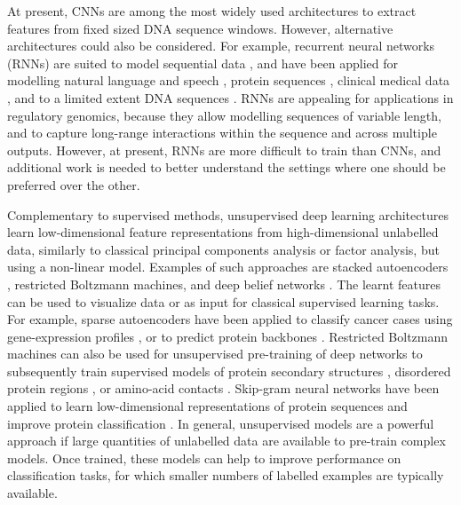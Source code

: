 At present, CNNs are among the most widely used architectures to extract features from fixed sized DNA sequence windows. However, alternative architectures could also be considered. For example, recurrent neural networks (RNNs) are suited to model sequential data \citep{lipton_critical_2015}, and have been applied for modelling natural language and speech \citep{che_distilling_2015,deng_deep_2015,graves_speech_2013,hinton_deep_2012,sutskever_sequence_2014,xiong_dynamic_2016}, protein sequences \citep{agathocleous_protein_2010,sonderby_protein_2014}, clinical medical data \citep{che_distilling_2015}, and to a limited extent DNA sequences \citep{lee_dna-level_2015}. RNNs are appealing for applications in regulatory genomics, because they allow modelling sequences of variable length, and to capture long-range interactions within the sequence and across multiple outputs. However, at present, RNNs are more difficult to train than CNNs, and additional work is needed to better understand the settings where one should be preferred over the other.

Complementary to supervised methods, unsupervised deep learning architectures learn low-dimensional feature representations from high-dimensional unlabelled data, similarly to classical principal components analysis or factor analysis, but using a non-linear model. Examples of such approaches are stacked autoencoders \citep{vincent_stacked_2010}, restricted Boltzmann machines, and deep belief networks \citep{hinton_reducing_2006}. The learnt features can be used to visualize data or as input for classical supervised learning tasks. For example, sparse autoencoders have been applied to classify cancer cases using gene-expression profiles \citep{fakoor_using_2013}, or to predict protein backbones \citep{lyons_predicting_2014}. Restricted Boltzmann machines can also be used for unsupervised pre-training of deep networks to subsequently train supervised models of protein secondary structures \citep{spencer_deep_2015}, disordered protein regions \citep{eickholt_predicting_2012,eickholt_dndisorder:_2013}, or amino-acid contacts \citep{eickholt_predicting_2012}. Skip-gram neural networks have been applied to learn low-dimensional representations of protein sequences and improve protein classification \citep{asgari_protvec:_2015}. In general, unsupervised models are a powerful approach if large quantities of unlabelled data are available to pre-train complex models. Once trained, these models can help to improve performance on classification tasks, for which smaller numbers of labelled examples are typically available.


